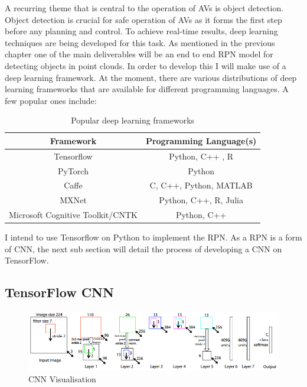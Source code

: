 A recurring theme that is central to the operation of AVs is object detection. Object detection is crucial for safe operation of AVs as it forms the first step before any planning and control. To achieve real-time results, deep learning techniques are being developed for this task. As mentioned in the previous chapter one of the main deliverables will be an end to end RPN model for detecting objects in point clouds. In order to develop this I will make use of a deep learning framework. 
At the moment, there are various distributions of deep learning frameworks that are available for different programming languages. 
A few popular ones include:
\begin{table}[H]
	\centering
	\begin{tabular}{|c|c|}
		\hline
		Framework & Programming Language(s)  \\ \hline
		Tensorflow &  Python, C++ , R  \\ \hline
		PyTorch & Python  \\ \hline
		Caffe & C, C++, Python, MATLAB \\ \hline
		MXNet & Python, C++, R, Julia \\ \hline
		Microsoft Cognitive Toolkit/CNTK & Python, C++ \\ \hline
		
	\end{tabular}
	\caption{Popular deep learning frameworks}
	\label{table:dlframeworks}
\end{table}

I intend to use Tensorflow on Python to implement the RPN. As a RPN is a form of CNN, the next sub section will detail the process of developing a CNN on TensorFlow. 

\subsection{TensorFlow CNN}
\begin{figure}
	\centering
	\includegraphics[width=\textwidth]{media/cnn.png}
	\caption{CNN Visualisation \cite{zeiler2014visualizing}}
	\label{ fig:cnn_vis}
\end{figure}

